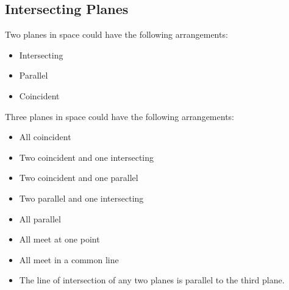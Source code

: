 \documentclass[10pt, a4paper, titlepage]{article}
\begin{document}
\begin{multicols*}{3}
	\dotfill
	\subsection{Intersecting Planes}
	Two planes in space could have the following arrangements:
	\begin{itemize}
		\item Intersecting
		\item Parallel
		\item Coincident
	\end{itemize}
	Three planes in space could have the following arrangements:
	\begin{itemize}
		\item All coincident
		\item Two coincident and one intersecting
		\item Two coincident and one parallel
		\item Two parallel and one intersecting
		\item All parallel
		\item All meet at one point
		\item All meet in a common line
		\item The line of intersection of any two planes is parallel to the third plane.
	\end{itemize}

	\hrulefill





\end{multicols*}
\end{document}
